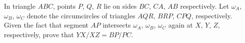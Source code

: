 In triangle $ABC$, points $P$, $Q$, $R$ lie on sides $BC$, $CA$, $AB$ respectively.  Let $\omega_A$, $\omega_B$, $\omega_C$ denote the circumcircles of triangles $AQR$, $BRP$, $CPQ$, respectively.  Given the fact that segment $AP$ intersects $\omega_A$, $\omega_B$, $\omega_C$ again at $X$, $Y$, $Z$, respectively, prove that $YX/XZ=BP/PC$.